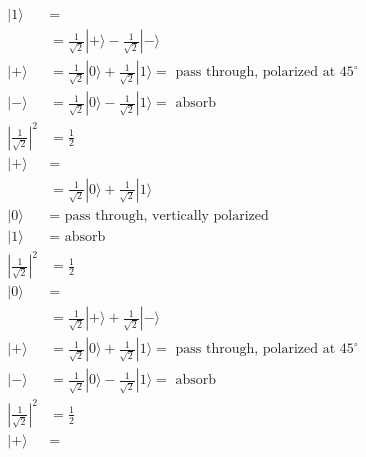 \documentclass[main.tex]{subfiles}
\begin{document}
\begin{enumerate}
    \begin{align*}
        |1\rangle                           & = \tag{input state}\\
                                            & = \frac{1}{\sqrt{2}}|+\rangle-\frac{1}{\sqrt{2}}|-\rangle \tag{device basis}\\
        |+\rangle                           & = \frac{1}{\sqrt{2}}|0\rangle+\frac{1}{\sqrt{2}}|1\rangle 
                                            = \text { pass through, polarized at } 45^{\circ} \tag {first polariser} \\
        |-\rangle                           & = \frac{1}{\sqrt{2}}|0\rangle-\frac{1}{\sqrt{2}}|1\rangle 
                                            = \text { absorb } \tag{first polariser}\\
        \left|\frac{1}{\sqrt{2}}\right|^{2} & = \frac{1}{2} \tag {probability of passing through}\\
        |+\rangle                           & = \tag{current state}\\
                                            & = \frac{1}{\sqrt{2}}|0\rangle+\frac{1}{\sqrt{2}}|1\rangle \tag{device basis}\\
        |0\rangle                           & = \text{ pass through, vertically polarized } \tag{second polariser}\\
        |1\rangle                           & = \text{ absorb } \tag{second polariser}\\
        \left|\frac{1}{\sqrt{2}}\right|^{2} & = \frac{1}{2} \tag {probability of passing through}\\
        |0\rangle                           & = \tag{current state}\\
                                            & = \frac{1}{\sqrt{2}}|+\rangle+\frac{1}{\sqrt{2}}|-\rangle \tag{device basis}\\
        |+\rangle                           & = \frac{1}{\sqrt{2}}|0\rangle+\frac{1}{\sqrt{2}}|1\rangle 
                                            = \text { pass through, polarized at } 45^{\circ} \tag {third polariser} \\
        |-\rangle                           & = \frac{1}{\sqrt{2}}|0\rangle-\frac{1}{\sqrt{2}}|1\rangle 
                                            = \text { absorb } \tag{third polariser}\\
        \left|\frac{1}{\sqrt{2}}\right|^{2} & = \frac{1}{2} \tag {probability of passing through}\\
        |+\rangle                           & = \tag{current state}\\

\end{align*}
\end{enumerate}
\end{document}
